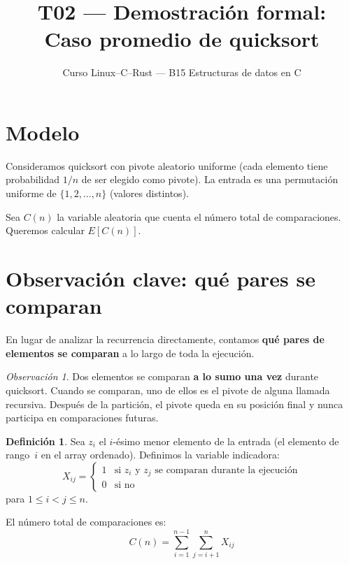 \documentclass[11pt, letterpaper]{article}
\title{%
  T02 --- Demostración formal:\\[4pt]
  Caso promedio de quicksort
}
\author{Curso Linux--C--Rust --- B15 Estructuras de datos en C}
\date{}
\theoremstyle{definition}
\newtheorem{definition}{Definición}[section]
\theoremstyle{plain}
\theoremstyle{remark}
\newtheorem{remark}{Observación}[section]
\begin{document}
\maketitle
\tableofcontents

\section{Modelo}

Consideramos quicksort con pivote aleatorio uniforme (cada elemento
tiene probabilidad $1/n$ de ser elegido como pivote). La entrada es una
permutación uniforme de $\{1, 2, \ldots, n\}$ (valores distintos).

Sea $C(n)$ la variable aleatoria que cuenta el número total de
comparaciones. Queremos calcular $E[C(n)]$.

\section{Observación clave: qué pares se comparan}

En lugar de analizar la recurrencia directamente, contamos
\textbf{qué pares de elementos se comparan} a lo largo de toda la
ejecución.

\begin{remark}
Dos elementos se comparan \textbf{a lo sumo una vez} durante
quicksort. Cuando se comparan, uno de ellos es el pivote de alguna
llamada recursiva. Después de la partición, el pivote queda en su
posición final y nunca participa en comparaciones futuras.
\end{remark}

\begin{definition}
Sea $z_i$ el $i$-ésimo menor elemento de la entrada (el elemento de
rango~$i$ en el array ordenado). Definimos la variable indicadora:
\[
  X_{ij} = \begin{cases}
    1 & \text{si } z_i \text{ y } z_j \text{ se comparan durante la
        ejecución} \\
    0 & \text{si no}
  \end{cases}
\]
para $1 \leq i < j \leq n$.
\end{definition}

El número total de comparaciones es:
\[
  C(n) = \sum_{i=1}^{n-1} \sum_{j=i+1}^{n} X_{ij}
\]
\end{document}
